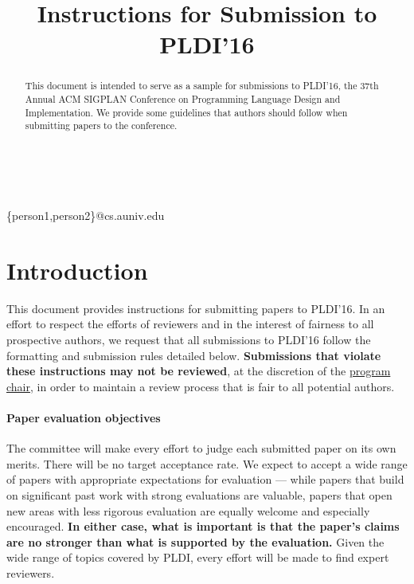 \documentclass[pldi]{sigplanconf-pldi16}
\begin{document}
\title{Instructions for Submission to PLDI'16}

%
%

{ \\
  \\
}
{\{person1,person2\}@cs.auniv.edu}

\maketitle

\begin{abstract}
  This document is intended to serve as a sample for submissions to PLDI'16,
  the 37th Annual ACM SIGPLAN Conference on Programming Language
  Design and Implementation.  We provide some guidelines
  that authors should follow when submitting papers to the conference.
\end{abstract}

\section{Introduction}

This document provides instructions for submitting papers to PLDI'16.
In an effort to respect the efforts of reviewers and in the interest
of fairness to all prospective authors, we request that all
submissions to PLDI'16 follow the formatting and submission rules
detailed below. \textbf{Submissions that violate these instructions
  may not be reviewed}, at the discretion of the
\href{mailto:emery@cs.umass.edu?subject=[PLDI'16]}{program
  chair}, in order to maintain a review process that is fair to all
potential authors.

\paragraph{Paper evaluation objectives}
The committee will make every effort to judge each submitted paper on
its own merits. There will be no target acceptance rate.  We expect to
accept a wide range of papers with appropriate expectations for
evaluation --- while papers that build on significant past work with
strong evaluations are valuable, papers that open new areas with less
rigorous evaluation are equally welcome and especially
encouraged. \textbf{In either case, what is important is that the
  paper's claims are no stronger than what is supported by the
  evaluation.}  Given the wide range of topics covered by PLDI, every
effort will be made to find expert reviewers.
\end{document}
